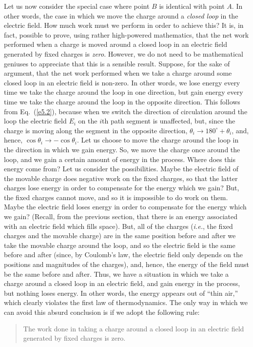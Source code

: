 Let us now consider the special case where point $B$ is identical with point
$A$. In other words, the case in which we move  the charge around a {\em closed loop}\/ in the electric
field. How much work must we perform in order to achieve this? 
It is, in fact, possible to prove, using rather high-powered mathematics, that
the net work performed when a charge is moved around a closed loop in an
electric field generated by fixed charges is {\em zero}. However,
we do not need to be  mathematical geniuses to appreciate that this is
a sensible result.
Suppose, for the sake of argument, that  the net work performed when we  take a charge around some
closed loop in an electric field is non-zero. In other words, we  lose energy
every time we take the charge around the loop in one direction, but gain energy
every time we take the charge around the loop in the opposite direction. This
follows from Eq.~(\ref{e5.2}), because when we switch the direction of circulation
around the loop the electric field $E_i$ on the $i$th path segment is unaffected, but,
since the charge is moving along the segment in the opposite direction,
$\theta_i \rightarrow 180^\circ +\theta_i$, and, hence, $\cos\theta_i\rightarrow
-\cos\theta_i$. Let us choose to move the charge around the loop in the direction
in which we gain energy. So, we move the charge once around the loop, and
we gain a certain amount of energy in the process. Where does this energy come from? Let us 
consider the possibilities. Maybe the electric field of the movable charge 
does negative work on the fixed charges, so
that the latter charges lose energy in order to compensate for the energy which
we gain? But, the  fixed charges  cannot move, and so
it is impossible to do work on them. Maybe the electric field
loses energy in order to compensate for the energy which
we gain? (Recall, from the previous section, that there is an energy associated
with an electric field which fills space).  But, all of the charges ({\em i.e.}, the
fixed charges and the movable charge)
 are in the same position before and after we take the
movable charge around the loop, and so the electric field is the same before and
after (since, by Coulomb's law, the electric field only depends on the positions
and magnitudes of the charges), and, hence, the energy of the field must be
the same before and after. Thus, we have a situation in which we take a
charge around a closed loop in an electric field, and gain energy in the process,
but nothing loses energy. In other words, the energy appears out of
``thin air,'' which clearly violates the first law of thermodynamics. 
The only way in which we can avoid this absurd conclusion is
if we adopt the following rule:
\begin{quote}
{\sf The work done in taking a charge around a closed loop in an electric
field generated by fixed charges is   zero.}
\end{quote}
 

